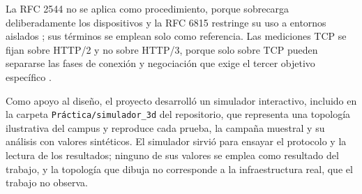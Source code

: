 La RFC 2544 no se aplica como procedimiento, porque sobrecarga deliberadamente los dispositivos y la RFC 6815 restringe su uso a entornos aislados \cite{rfc2544,rfc6815}; sus términos se emplean solo como referencia. Las mediciones TCP se fijan sobre HTTP/2 y no sobre HTTP/3, porque solo sobre TCP pueden separarse las fases de conexión y negociación que exige el tercer objetivo específico \cite{rfc9114}.

Como apoyo al diseño, el proyecto desarrolló un simulador interactivo, incluido en la carpeta \texttt{Práctica/simulador\_3d} del repositorio, que representa una topología ilustrativa del campus y reproduce cada prueba, la campaña muestral y su análisis con valores sintéticos. El simulador sirvió para ensayar el protocolo y la lectura de los resultados; ninguno de sus valores se emplea como resultado del trabajo, y la topología que dibuja no corresponde a la infraestructura real, que el trabajo no observa. 
